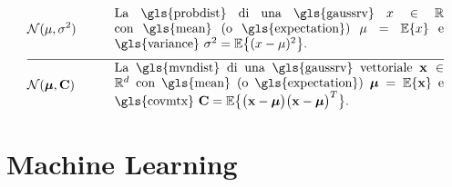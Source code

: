 \begin{align}
	&\mathcal{N}(\mu, \sigma^{2}) \quad\quad & \parbox{.75\textwidth}{La \gls{probdist} di una 
		\gls{gaussrv} $\feature \in \mathbb{R}$ con \gls{mean} (o \gls{expectation}) $\mu= \expect \{ \feature \}$ 
		e \gls{variance} $\sigma^{2} =   \expect \big\{  (  \feature - \mu )^2 \big\}$.} \nonumber    \nonumber \\[2mm] \hline \nonumber\\[-5mm]
	&\mathcal{N}(\clustermean, \mathbf{C}) \quad\quad & \parbox{.75\textwidth}{La \gls{mvndist} di una		\gls{gaussrv} vettoriale $\featurevec \in \mathbb{R}^{\featuredim}$ con \gls{mean} (o \gls{expectation}) $\clustermean= \expect \{ \featurevec \}$ 
		e \gls{covmtx} $\mathbf{C} =  \expect \big\{ \big( \featurevec - \clustermean \big)\big( \featurevec - \clustermean \big)^{T} \big\}$.} \nonumber                                             
\end{align}





\newpage
\section*{Machine Learning}

